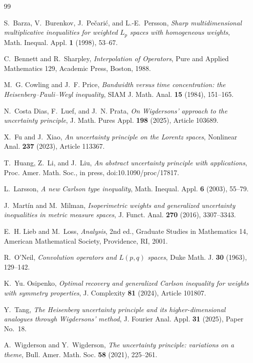 \documentclass[11pt]{amsart}
\theoremstyle{remark}
\begin{document}
\begin{thebibliography}{99}

S.~Barza, V.~Burenkov, J.~Pe\v{c}ari\'{c}, and L.-E.~Persson,
\emph{Sharp multidimensional multiplicative inequalities for weighted
$L_p$ spaces with homogeneous weights},
Math. Inequal. Appl. \textbf{1} (1998), 53--67.

C.~Bennett and R.~Sharpley,
\emph{Interpolation of Operators},
Pure and Applied Mathematics 129, Academic Press, Boston, 1988.

M.~G. Cowling and J.~F. Price,
\emph{Bandwidth versus time concentration: the Heisenberg--Pauli--Weyl
inequality},
SIAM J. Math. Anal. \textbf{15} (1984), 151--165.

N.~Costa Dias, F.~Luef, and J.~N. Prata,
\emph{On Wigdersons' approach to the uncertainty principle},
J. Math. Pures Appl. \textbf{198} (2025), Article 103689.

X.~Fu and J.~Xiao,
\emph{An uncertainty principle on the Lorentz spaces},
Nonlinear Anal. \textbf{237} (2023), Article 113367.

T.~Huang, Z.~Li, and J.~Liu,
\emph{An abstract uncertainty principle with applications},
Proc. Amer. Math. Soc., in press, doi:10.1090/proc/17817.

L.~Larsson,
\emph{A new Carlson type inequality},
Math. Inequal. Appl. \textbf{6} (2003), 55--79.

J.~Mart\'in and M.~Milman,
\emph{Isoperimetric weights and generalized uncertainty inequalities in
metric measure spaces},
J. Funct. Anal. \textbf{270} (2016), 3307--3343.

E.~H. Lieb and M.~Loss,
\emph{Analysis}, 2nd ed.,
Graduate Studies in Mathematics 14, American Mathematical Society,
Providence, RI, 2001.

R.~O'Neil,
\emph{Convolution operators and $L(p,q)$ spaces},
Duke Math. J. \textbf{30} (1963), 129--142.

K.~Yu. Osipenko,
\emph{Optimal recovery and generalized Carlson inequality for weights
with symmetry properties},
J. Complexity \textbf{81} (2024), Article 101807.

Y.~Tang,
\emph{The Heisenberg uncertainty principle and its higher-dimensional
analogues through Wigdersons' method},
J. Fourier Anal. Appl. \textbf{31} (2025), Paper No.~18.

A.~Wigderson and Y.~Wigderson,
\emph{The uncertainty principle: variations on a theme},
Bull. Amer. Math. Soc. \textbf{58} (2021), 225--261.

\end{thebibliography}
\end{document}
